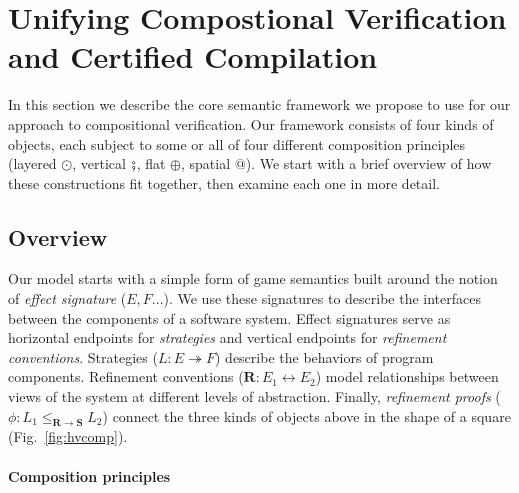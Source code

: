 \section{Unifying Compostional Verification and Certified Compilation}
\label{sec:compcerto}

In this section we describe the core semantic framework
we propose to use for our approach to compositional verification.
%
Our framework consists of four kinds of objects,
each subject to some or all of four
different composition principles
(layered $\odot$,
 vertical $\fatsemi$,
 flat $\oplus$,
 spatial $\mathbin@$).
We start with a brief overview of how these constructions fit together,
then examine each one in more detail.

\subsection{Overview} %


Our model starts with a simple form of game semantics
built around the notion of \emph{effect signature} ($E, F\ldots$).
We use these signatures to describe the
interfaces between the components of a software system.
Effect signatures serve
as horizontal endpoints for \emph{strategies}
and vertical endpoints for \emph{refinement conventions}.
Strategies
($L : E \twoheadrightarrow F$)
describe the behaviors of program components.
Refinement conventions
($\mathbf{R} : E_1 \leftrightarrow E_2$)
model relationships between
views of the system at different levels of abstraction.
Finally,
\emph{refinement proofs}
($\phi : L_1 \le_{\mathbf{R} \rightarrow \mathbf{S}} L_2$)
connect the three kinds of objects above
in the shape of a square (Fig.~\ref{fig:hvcomp}).


\vspace*{-2ex}
\paragraph{Composition principles} %

